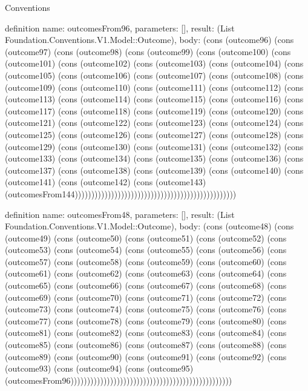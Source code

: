 \begin{lexlean}{Conventions}
\begin{semanticmodule}
definition{
  name: outcomesFrom96,
  parameters: [],
  result: (List Foundation.Conventions.V1.Model::Outcome),
  body: (cons (outcome96) (cons (outcome97) (cons (outcome98) (cons (outcome99) (cons (outcome100) (cons (outcome101) (cons (outcome102) (cons (outcome103) (cons (outcome104) (cons (outcome105) (cons (outcome106) (cons (outcome107) (cons (outcome108) (cons (outcome109) (cons (outcome110) (cons (outcome111) (cons (outcome112) (cons (outcome113) (cons (outcome114) (cons (outcome115) (cons (outcome116) (cons (outcome117) (cons (outcome118) (cons (outcome119) (cons (outcome120) (cons (outcome121) (cons (outcome122) (cons (outcome123) (cons (outcome124) (cons (outcome125) (cons (outcome126) (cons (outcome127) (cons (outcome128) (cons (outcome129) (cons (outcome130) (cons (outcome131) (cons (outcome132) (cons (outcome133) (cons (outcome134) (cons (outcome135) (cons (outcome136) (cons (outcome137) (cons (outcome138) (cons (outcome139) (cons (outcome140) (cons (outcome141) (cons (outcome142) (cons (outcome143) (outcomesFrom144)))))))))))))))))))))))))))))))))))))))))))))))))
}

definition{
  name: outcomesFrom48,
  parameters: [],
  result: (List Foundation.Conventions.V1.Model::Outcome),
  body: (cons (outcome48) (cons (outcome49) (cons (outcome50) (cons (outcome51) (cons (outcome52) (cons (outcome53) (cons (outcome54) (cons (outcome55) (cons (outcome56) (cons (outcome57) (cons (outcome58) (cons (outcome59) (cons (outcome60) (cons (outcome61) (cons (outcome62) (cons (outcome63) (cons (outcome64) (cons (outcome65) (cons (outcome66) (cons (outcome67) (cons (outcome68) (cons (outcome69) (cons (outcome70) (cons (outcome71) (cons (outcome72) (cons (outcome73) (cons (outcome74) (cons (outcome75) (cons (outcome76) (cons (outcome77) (cons (outcome78) (cons (outcome79) (cons (outcome80) (cons (outcome81) (cons (outcome82) (cons (outcome83) (cons (outcome84) (cons (outcome85) (cons (outcome86) (cons (outcome87) (cons (outcome88) (cons (outcome89) (cons (outcome90) (cons (outcome91) (cons (outcome92) (cons (outcome93) (cons (outcome94) (cons (outcome95) (outcomesFrom96)))))))))))))))))))))))))))))))))))))))))))))))))
}


\end{semanticmodule}
\end{lexlean}
